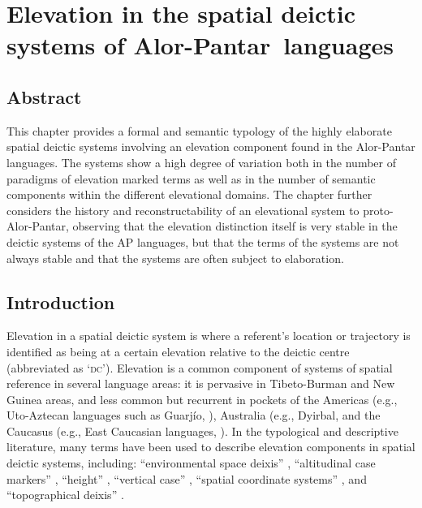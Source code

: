 

\chapter{Elevation in the spatial deictic systems of Alor-Pantar~languages}

\section*{Abstract}
This chapter provides a formal and semantic typology of the highly elaborate spatial deictic systems involving an elevation component found in the Alor-Pantar languages. The systems show a high degree of variation both in the number of paradigms of elevation marked terms as well as in the number of semantic components within the different elevational domains. The chapter further considers the history and reconstructability of an elevational system to proto-Alor-Pantar, observing that the elevation distinction itself is very stable in the deictic systems of the AP languages, but that the terms of the systems are not always stable and that the systems are often subject to elaboration.

\section{Introduction}\footnotemark{}
Elevation in a spatial deictic system is where a referent's location or trajectory is identified as being at a certain elevation relative to the deictic centre (abbreviated as `\textsc{dc}'). Elevation is a common component of systems of spatial reference in several language areas: it is pervasive in Tibeto-Burman \citep{Bickel2001,Cheung2007,Post2011} and New Guinea \citep{Senft1997,Senft2004,Diessel1999,Levinson1983} areas, and less common but recurrent in pockets of the Americas (e.g., Uto-Aztecan languages such as Guarj\'io, \citet{Miller1996}), Australia (e.g., Dyirbal, \citet[48]{Dixon1972} and the Caucasus (e.g., East Caucasian languages, \citet{Schulze2003}). In the typological and descriptive literature, many terms have been used to describe elevation components in spatial deictic systems, including: ``environmental space deixis'' \citep{Bickel2001}, ``altitudinal case markers'' \citep{Ebert2003}, ``height'' \citep{Dixon2003}, ``vertical case'' \citep{Noonan2006}, ``spatial coordinate systems'' \citep{Burenhult2008}, and ``topographical deixis'' \citep{Post2011}.

